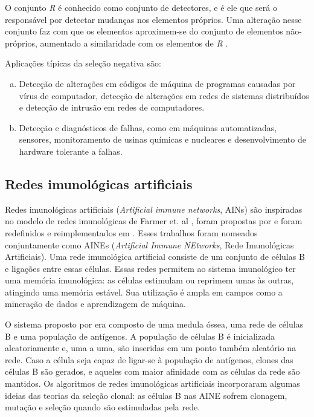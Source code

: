 O conjunto \emph{R} é conhecido como conjunto de detectores, e é ele que será o responsável por detectar mudanças nos elementos próprios. Uma alteração nesse conjunto faz com que os elementos aproximem-se do conjunto de elementos não-próprios, aumentado a similaridade com os elementos de \emph{R} \cite{Garrett2005}.

Aplicações típicas da seleção negativa são:

\begin{enumerate}[a)]
    \item Detecção de alterações em códigos de máquina de programas causadas por vírus de computador, detecção de alterações em redes de sistemas distribuídos e detecção de intrusão em redes de computadores.
    \item Detecção e diagnósticos de falhas, como em máquinas automatizadas, sensores, monitoramento de usinas químicas e nucleares e desenvolvimento de hardware tolerante a falhas.
\end{enumerate}

\subsection{Redes imunológicas artificiais}

Redes imunológicas artificiais (\emph{Artificial immune networks}, AINs) são inspiradas no modelo de redes imunológicas de Farmer et. al \cite{Farmer1986}, foram propostas por \citet{Ishida1990} e foram redefinidos e reimplementados em \citet{Timmis2000}. Esses trabalhos foram nomeados conjuntamente como AINEs (\emph{Artificial Immune NEtworks}, Rede Imunológicas Artificiais). Uma rede imunológica artificial consiste de um conjunto de células B e ligações entre essas células. Essas redes permitem ao sistema imunológico ter uma memória imunológica: as células estimulam ou reprimem umas às outras, atingindo uma memória estável. Sua utilização é ampla em campos como a mineração de dados e aprendizagem de máquina.

O sistema proposto por \citeauthor{Timmis2000} era composto de uma medula óssea, uma rede de células B e uma população de antígenos. A população de células B é inicializada aleatoriamente e, uma a uma, são inseridas em um ponto também aleatório na rede. Caso a célula seja capaz de ligar-se à população de antígenos, clones das células B são gerados, e aqueles com maior afinidade com as células da rede são mantidos. Os algoritmos de redes imunológicas artificiais incorporaram algumas ideias das teorias da seleção clonal: as células B nas AINE sofrem clonagem, mutação e seleção quando são estimuladas pela rede.

